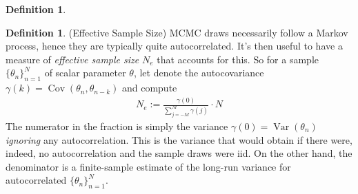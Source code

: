 \documentclass[12pt]{article}
\theoremstyle{plain}
\theoremstyle{definition}
\newtheorem{defn}[thm]{Definition}
\theoremstyle{remark}
\newcommand{\bstheta}{\boldsymbol{\theta}}
\newcommand{\Cov}{\operatorname{Cov}}
\newcommand{\Var}{\operatorname{Var}}
\newcommand{\nN}{_{n=1}^N}
\begin{document}
\begin{defn}


\end{defn}





\begin{defn}(Effective Sample Size)
MCMC draws necessarily follow a Markov process, hence they are typically
quite autocorrelated. It's then useful to have a measure of
\emph{effective sample size} $N_{e}$ that accounts for this.
So for a sample $\{\theta_n\}\nN$ of scalar parameter $\theta$, let
denote the autocovariance $\gamma(k)=\Cov(\theta_n,\theta_{n-k})$ and
compute
\begin{align*}
  N_{e}
  :=
  \frac{\gamma(0)}{\sum_{j=-M}^M \gamma(j)}
  \cdot N
\end{align*}
The numerator in the fraction is simply the variance
$\gamma(0)=\Var(\theta_n)$ \emph{ignoring} any autocorrelation.
This is the variance that would obtain if there were, indeed, no
autocorrelation and the sample draws were iid.
On the other hand, the denominator is a finite-sample estimate of the
long-run variance for autocorrelated $\{\theta_n\}\nN$.
\end{defn}
\end{document}
